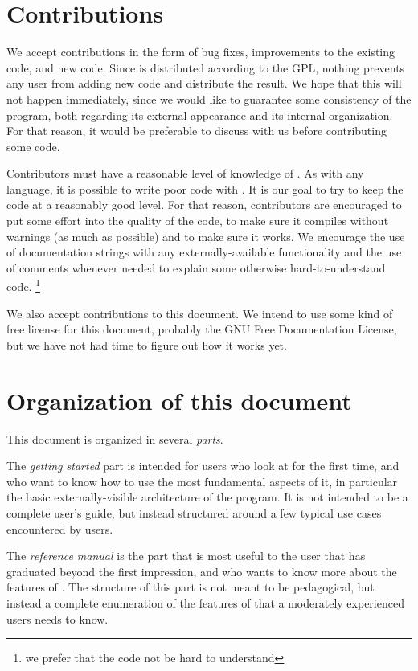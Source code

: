 \section{Contributions}

We accept contributions in the form of bug fixes, improvements to the
existing code, and new code.  Since \sysname{} is distributed according to
the GPL, nothing prevents any user from adding new code and distribute the
result.  We hope that this will not happen immediately, since we would
like to guarantee some consistency of the program, both regarding its
external appearance and its internal organization.  For that reason,
it would be preferable to discuss with us before contributing some
code. 

Contributors must have a reasonable level of knowledge of {\commonlisp}.  As
with any language, it is possible to write poor code with {\commonlisp}.  It
is our goal to try to keep the code at a reasonably good level.  For
that reason, contributors are encouraged to put some effort into the
quality of the code, to make sure it compiles without warnings (as
much as possible) and to make sure it works.  We encourage the use of
documentation strings with any externally-available functionality and
the use of comments whenever needed to explain some otherwise
hard-to-understand code. \footnote{we prefer that the code not be hard
  to understand}

We also accept contributions to this document.  We intend to use some
kind of free license for this document, probably the GNU Free
Documentation License, but we have not had time to figure out how it
works yet. 
\section{Organization of this document}

This document is organized in several \emph{parts}.  

The \emph{getting started} part is intended for users who look at
\sysname{} for the first time, and who want to know how to use the most
fundamental aspects of it, in particular the basic externally-visible
architecture of the program.  It is not intended to be a complete
user's guide, but instead structured around a few typical use cases
encountered by users.

The \emph{reference manual} is the part that is most useful to the
user that has graduated beyond the first impression, and who wants to
know more about the features of \sysname{}.  The structure of this part is
not meant to be pedagogical, but instead a complete enumeration of the
features of \sysname{} that a moderately experienced users needs to know. 

